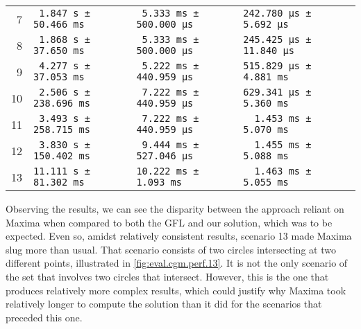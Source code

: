 \begin{table}[htb]
\begin{tabular*}{\linewidth}{r*{3}{l}l}
     7 & \verb| 1.847 s ±  50.466 ms|
       & \verb| 5.333 ms ± 500.000 μs|
       & \verb|242.780 μs ±  5.692 μs| &\\
     8 & \verb| 1.868 s ±  37.650 ms|
       & \verb| 5.333 ms ± 500.000 μs|
       & \verb|245.425 μs ± 11.840 μs| &\\
     9 & \verb| 4.277 s ±  37.053 ms|
       & \verb| 5.222 ms ± 440.959 μs|
       & \verb|515.829 μs ±  4.881 ms| &\\
    10 & \verb| 2.506 s ± 238.696 ms|
       & \verb| 7.222 ms ± 440.959 μs|
       & \verb|629.341 μs ±  5.360 ms| &\\
    11 & \verb| 3.493 s ± 258.715 ms|
       & \verb| 7.222 ms ± 440.959 μs|
       & \verb|  1.453 ms ±  5.070 ms| &\\
    12 & \verb| 3.830 s ± 150.402 ms|
       & \verb| 9.444 ms ± 527.046 μs|
       & \verb|  1.455 ms ±  5.088 ms| &\\
    13 & \verb|11.111 s ±  81.302 ms|
       & \verb|10.222 ms ±   1.093 ms|
       & \verb|  1.463 ms ±  5.055 ms| &\\
    \bottomrule
  \end{tabular*}
\end{table}

Observing the results, we can see the disparity between the approach reliant on
Maxima when compared to both the \ac{GFL} and our solution, which was to be
expected.  Even so, amidst relatively consistent results, scenario 13 made
Maxima slug more than usual.  That scenario consists of two circles intersecting
at two different points, illustrated in \cref{fig:eval.cgm.perf.13}.  It is not
the only scenario of the set that involves two circles that intersect.  However,
this is the one that produces relatively more complex results, which could
justify why Maxima took relatively longer to compute the solution than it did
for the scenarios that preceded this one.

